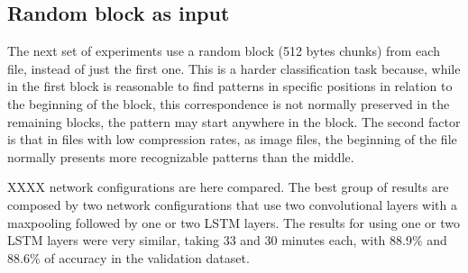 % 






\subsection{Random block as input}

The next set of experiments use a random block (512 bytes chunks) from each file, instead of just the first one. This is a harder classification task because, while in the first block is reasonable to find patterns in specific positions in relation to the beginning of the block, this correspondence is not normally preserved in the remaining blocks, the pattern may start anywhere in the block. The second factor is that in files with low compression rates, as image files, the beginning of the file normally presents more recognizable patterns than the middle.


XXXX network configurations are here compared.
The best group of results are composed by two network configurations that use two convolutional layers with a maxpooling followed by one or two LSTM layers. The results for using one or two LSTM layers were very similar, taking 33 and 30 minutes each, with 88.9\% and 88.6\% of accuracy in the validation dataset. 

